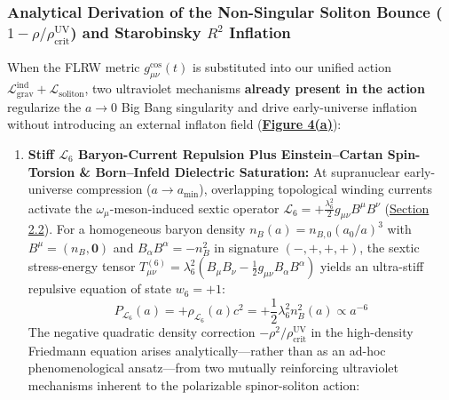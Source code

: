 \documentclass[10pt,aps,prd,twocolumn,superscriptaddress,nofootinbib,floatfix,longbibliography,showkeys]{revtex4-2}
\begin{document}
\subsubsection{Analytical Derivation of the Non-Singular Soliton Bounce ($1 - \rho/\rho_{\text{crit}}^{\text{UV}}$) and Starobinsky $R^2$ Inflation}

When the FLRW metric $g_{\mu\nu}^{\text{cos}}(t)$ is substituted into our unified action $\mathcal{L}_{\text{grav}}^{\text{ind}} + \mathcal{L}_{\text{soliton}}$, two ultraviolet mechanisms \textbf{already present in the action} regularize the $a \to 0$ Big Bang singularity and drive early-universe inflation without introducing an external inflaton field (\textbf{\hyperref[fig:fig4]{Figure 4(a)}}):
\begin{enumerate}
  \item \textbf{Stiff $\mathcal{L}_6$ Baryon-Current Repulsion Plus Einstein--Cartan Spin-Torsion \& Born--Infeld Dielectric Saturation:} At supranuclear early-universe compression ($a \to a_{\min}$), overlapping topological winding currents activate the $\omega_\mu$-meson-induced sextic operator $\mathcal{L}_6 = +\frac{\lambda_6^2}{2} g_{\mu\nu} B^\mu B^\nu$ (\hyperref[sec:2.2]{Section 2.2}). For a homogeneous baryon density $n_B(a) = n_{B,0}(a_0/a)^3$ with $B^\mu = (n_B, \mathbf{0})$ and $B_\alpha B^\alpha = -n_B^2$ in signature $(-,+,+,+)$, the sextic stress-energy tensor $T_{\mu\nu}^{(6)} = \lambda_6^2\left(B_\mu B_\nu - \frac{1}{2}g_{\mu\nu} B_\alpha B^\alpha\right)$ yields an ultra-stiff repulsive equation of state $w_6 = +1$:
\begin{equation}
P_{\mathcal{L}_6}(a) = +\rho_{\mathcal{L}_6}(a) c^2 = +\frac{1}{2}\lambda_6^2 n_B^2(a) \propto a^{-6}
\end{equation}
  The negative quadratic density correction $-\rho^2/\rho_{\text{crit}}^{\text{UV}}$ in the high-density Friedmann equation arises analytically---rather than as an ad-hoc phenomenological ansatz---from two mutually reinforcing ultraviolet mechanisms inherent to the polarizable spinor-soliton action:
  \begin{itemize}

\end{itemize}
\end{enumerate}
\end{document}
